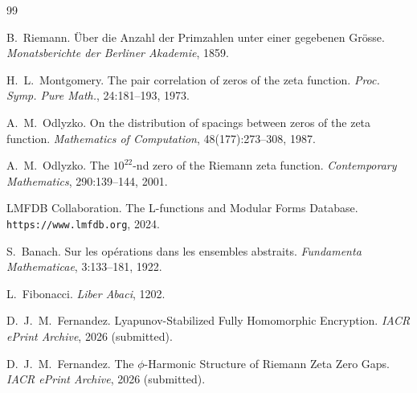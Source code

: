 \documentclass[11pt,a4paper]{article}
\begin{document}
\begin{thebibliography}{99}

B.~Riemann.
\newblock \"Uber die Anzahl der Primzahlen unter einer gegebenen Gr\"osse.
\newblock \emph{Monatsberichte der Berliner Akademie}, 1859.

H.~L.~Montgomery.
\newblock The pair correlation of zeros of the zeta function.
\newblock \emph{Proc. Symp. Pure Math.}, 24:181--193, 1973.

A.~M.~Odlyzko.
\newblock On the distribution of spacings between zeros of the zeta function.
\newblock \emph{Mathematics of Computation}, 48(177):273--308, 1987.

A.~M.~Odlyzko.
\newblock The $10^{22}$-nd zero of the Riemann zeta function.
\newblock \emph{Contemporary Mathematics}, 290:139--144, 2001.

LMFDB Collaboration.
\newblock The L-functions and Modular Forms Database.
\newblock \texttt{https://www.lmfdb.org}, 2024.

S.~Banach.
\newblock Sur les op\'erations dans les ensembles abstraits.
\newblock \emph{Fundamenta Mathematicae}, 3:133--181, 1922.

L.~Fibonacci.
\newblock \emph{Liber Abaci}, 1202.

D.~J.~M.~Fernandez.
\newblock Lyapunov-Stabilized Fully Homomorphic Encryption.
\newblock \emph{IACR ePrint Archive}, 2026 (submitted).

D.~J.~M.~Fernandez.
\newblock The $\phi$-Harmonic Structure of Riemann Zeta Zero Gaps.
\newblock \emph{IACR ePrint Archive}, 2026 (submitted).

\end{thebibliography}
\end{document}
